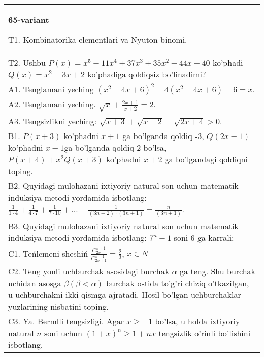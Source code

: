 \documentclass{article}
\begin{document}
\begin{tabular}{m{17cm}}
\textbf{65-variant}
\newline

T1. Kombinatorika elementlari va Nyuton binomi. \\
T2. Ushbu \(P(x) = x^{5} + 11x^{4} + 37x^{3} + 35x^{2} - 44x - 40\) ko'phadi \(Q(x) = x^{2} + 3x + 2\) ko'phadiga qoldiqsiz bo'linadimi? \\
A1. Tenglamani yeching \(\left( x^{2} - 4x + 6 \right)^{2} - 4\left( x^{2} - 4x + 6 \right) + 6 = x\). \\
A2. Tenglamani yeching. \(\sqrt{x} + \frac{2x + 1}{x + 2} = 2\). \\
A3. Tengsizlikni yeching: \(\sqrt{x + 3} + \sqrt{x - 2} - \sqrt{2x + 4} > 0\). \\
B1. \(P(x + 3)\) ko'phadni \(x + 1\) ga bo'lganda qoldiq -3, \(Q(2x - 1)\) ko'phadni \(x - 1\)ga bo'lganda qoldiq 2 bo'lsa, \(P(x + 4) + x^{2}Q(x + 3)\) ko'phadni \(x + 2\) ga bo'lgandagi qoldiqni toping. \\
B2. Quyidagi mulohazani ixtiyoriy natural son uchun matematik induksiya metodi yordamida isbotlang: \(\frac{1}{1 \cdot 4} + \frac{1}{4 \cdot 7} + \frac{1}{7 \cdot 10} + \ldots + \frac{1}{(3n - 2) \cdot (3n + 1)} = \frac{n}{(3n + 1)}\). \\
B3. Quyidagi mulohazani ixtiyoriy natural son uchun matematik induksiya metodi yordamida isbotlang: \(7^{n} - 1\) soni 6 ga karrali; \\
C1. Teńlemeni sheshiń \(\frac{C_{2x}^{x + 1}}{C_{2x + 1}^{x - 1}} = \frac{2}{3}\), \(x \in N\) \\
C2. Teng yonli uchburchak asosidagi burchak \(\alpha\) ga teng. Shu burchak uchidan asosga \(\beta(\beta < \alpha)\) burchak ostida to'g'ri chiziq o'tkazilgan, u uchburchakni ikki qismga ajratadi. Hosil bo'lgan uchburchaklar yuzlarining nisbatini toping. \\
C3. Ya. Bermlli tengsizligi. Agar \(x \geq - 1\) bo'lsa, u holda ixtiyoriy natural \(n\) soni uchun \((1 + x)^{n} \geq 1 + nx\) tengsizlik o'rinli bo'lishini isbotlang. \\

\end{tabular}
\vspace{1cm}
\end{document}
